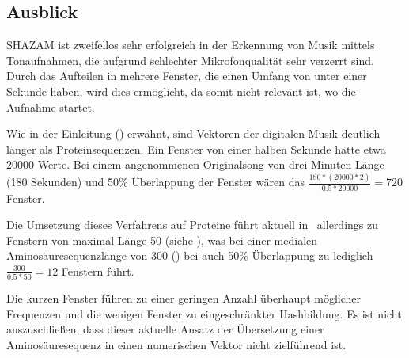     \subsection*{Ausblick} %
        \label{sub:ausblick}
        SHAZAM ist zweifellos sehr erfolgreich in der Erkennung von Musik mittels Tonaufnahmen, die aufgrund schlechter Mikrofonqualität sehr verzerrt sind. Durch das Aufteilen in mehrere Fenster, die einen Umfang von unter einer Sekunde haben, wird dies ermöglicht, da somit nicht relevant ist, wo die Aufnahme startet.

        Wie in der Einleitung () erwähnt, sind Vektoren der digitalen Musik deutlich länger als Proteinsequenzen. Ein Fenster von einer halben Sekunde hätte etwa 20000 Werte. Bei einem angenommenen Originalsong von drei Minuten Länge (180 Sekunden) und 50\% Überlappung der Fenster wären das $\frac{180 * (20000 * 2)}{0.5 * 20000}=720$ Fenster.

        Die Umsetzung dieses Verfahrens auf Proteine führt aktuell in \protfin\ allerdings zu Fenstern von maximal Länge 50 (siehe ), was bei einer medialen Aminosäuresequenzlänge von 300 () bei auch 50\% Überlappung zu lediglich $\frac{300}{0.5 * 50}=12$ Fenstern führt.

        Die kurzen Fenster führen zu einer geringen Anzahl überhaupt möglicher Frequenzen und die wenigen Fenster zu eingeschränkter Hashbildung. Es ist nicht auszuschließen, dass dieser aktuelle Ansatz der Übersetzung einer Aminosäuresequenz in einen numerischen Vektor nicht zielführend ist.

